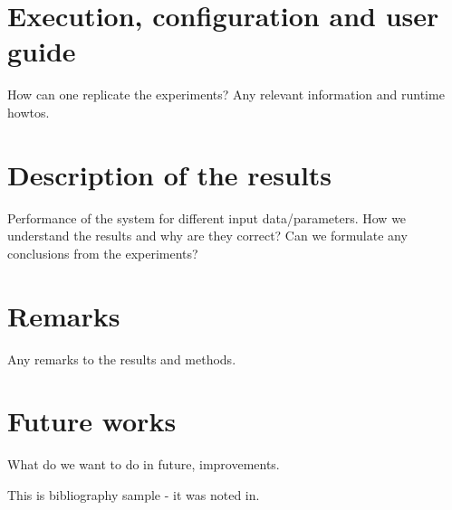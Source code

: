 \documentclass[titlepage]{article}
\begin{document}
\section{Execution, configuration and user guide}
How can one replicate the experiments?
Any relevant information and runtime howtos.
\section{Description of the results}
Performance of the system for different input data/parameters.
How we understand the results and why are they correct?
Can we formulate any conclusions from the experiments?
\section{Remarks}
Any remarks to the results and methods.
\section{Future works}
What do we want to do in future, improvements.

This is bibliography sample - it was noted in\cite{ms-paper1}.

\newpage
\printbibliography
\end{document}
